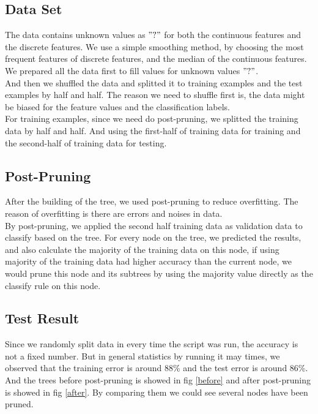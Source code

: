 \documentclass[11pt]{article}
\begin{document}
\subsection{Data Set}

The data contains unknown values as $"?"$ for both the continuous features and the discrete features. We use a simple smoothing method,
by choosing the most frequent features of discrete features, and the median of the continuous features. \\
We prepared all the data first to fill values for unknown values $"?"$. \\
And then we shuffled the data and splitted it to training examples and the test examples by half and half. The reason we
need to shuffle first is, the data might be biased for the feature values and the classification labels. \\
For training examples, since we need do post-pruning, we splitted the training data by half and half. And using the first-half
of training data for training and the second-half of training data for testing.

\subsection{Post-Pruning}

After the building of the tree, we used post-pruning to reduce overfitting. The reason of overfitting is there are errors and noises
in data. \\
By post-pruning, we applied the second half training data as validation data to classify based on the tree.
For every node on the tree, we predicted the results, and also calculate the majority of the training data on this node,
if using majority of the training data had higher accuracy than the current node, we would prune this node and its subtrees by using
the majority value directly as the classify rule on this node.

\subsection{Test Result}

Since we randomly split data in every time the script was run, the accuracy is not a fixed number. But in general statistics by running it may times,
we observed that the training error is around 88\% and the test error is around 86\%. \\
And the trees before post-pruning is showed in fig \ref{before} and after post-pruning is showed in fig \ref{after}. By comparing them we could see
several nodes have been pruned.
\end{document}
